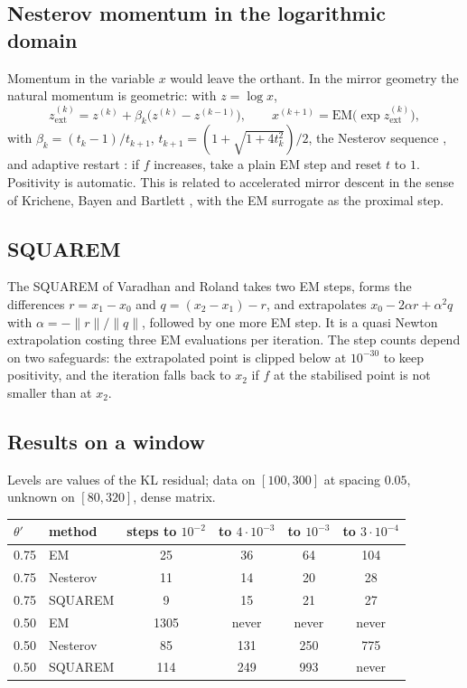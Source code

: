 \subsection{Nesterov momentum in the logarithmic domain}

Momentum in the variable $x$ would leave the orthant. In the mirror geometry the natural momentum is geometric: with $z=\log x$,
\begin{equation}\label{cx:eq:nesterov}
z^{(k)}_{\mathrm{ext}}=z^{(k)}+\beta_k\bigl(z^{(k)}-z^{(k-1)}\bigr),\qquad x^{(k+1)}=\mathrm{EM}\bigl(\exp z^{(k)}_{\mathrm{ext}}\bigr),
\end{equation}
with $\beta_k=(t_k-1)/t_{k+1}$, $t_{k+1}=(1+\sqrt{1+4t_k^2})/2$, the Nesterov sequence \cite{Nesterov83}, and adaptive restart \cite{OC15}: if $f$ increases, take a plain EM step and reset $t$ to $1$. Positivity is automatic. This is related to accelerated mirror descent in the sense of Krichene, Bayen and Bartlett \cite{KBB15}, with the EM surrogate as the proximal step.

\subsection{SQUAREM}

The SQUAREM of Varadhan and Roland \cite{VR08} takes two EM steps, forms the differences $r=x_1-x_0$ and $q=(x_2-x_1)-r$, and extrapolates $x_0-2\alpha r+\alpha^2q$ with $\alpha=-\|r\|/\|q\|$, followed by one more EM step. It is a quasi Newton extrapolation costing three EM evaluations per iteration. The step counts depend on two safeguards: the extrapolated point is clipped below at $10^{-30}$ to keep positivity, and the iteration falls back to $x_2$ if $f$ at the stabilised point is not smaller than at $x_2$.

\subsection{Results on a window}

Levels are values of the KL residual; data on $[100,300]$ at spacing $0.05$, unknown on $[80,320]$, dense matrix.

\begin{center}
\small
\begin{tabular}{llcccc}
\toprule
$\theta'$ & method & steps to $10^{-2}$ & to $4\cdot10^{-3}$ & to $10^{-3}$ & to $3\cdot10^{-4}$\\
\midrule
0.75 & EM & 25 & 36 & 64 & 104\\
0.75 & Nesterov & 11 & 14 & 20 & 28\\
0.75 & SQUAREM & 9 & 15 & 21 & 27\\
\midrule
0.50 & EM & 1305 & never & never & never\\
0.50 & Nesterov & 85 & 131 & 250 & 775\\
0.50 & SQUAREM & 114 & 249 & 993 & never\\
\bottomrule
\end{tabular}
\end{center}

